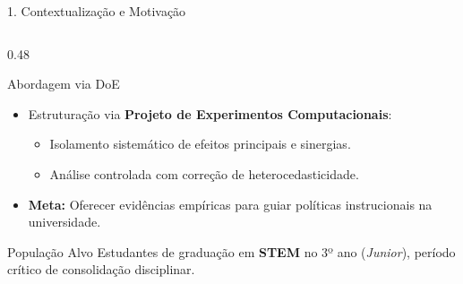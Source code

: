 \documentclass[aspectratio=169, 10pt]{beamer}
\begin{document}
\begin{frame}{1. Contextualização e Motivação}
\begin{columns}[T]
        \begin{column}{0.48\textwidth}
            \begin{block}{Abordagem via DoE}
                \begin{itemize}\setlength{\itemsep}{5pt}
                    \item Estruturação via \textbf{Projeto de Experimentos Computacionais}:
                    \begin{itemize}
                        \item Isolamento sistemático de efeitos principais e sinergias.
                        \item Análise controlada com correção de heterocedasticidade.
                    \end{itemize}
                    \item \textbf{Meta:} Oferecer evidências empíricas para guiar políticas instrucionais na universidade.
                \end{itemize}
            \end{block}
            \begin{exampleblock}{População Alvo}
                Estudantes de graduação em \textbf{STEM} no 3º ano (\textit{Junior}), período crítico de consolidação disciplinar.
            \end{exampleblock}
        \end{column}
    \end{columns}
\end{frame}
\end{document}
